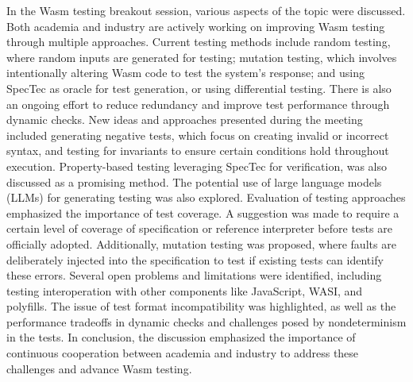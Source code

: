 \documentclass[a4paper,UKenglish]{dagrep-v2018}
\begin{document}
In the Wasm testing breakout session, various aspects of the topic were discussed.
Both academia and industry are actively working on improving Wasm testing through multiple approaches. Current testing methods include random testing, where random inputs are generated for testing; mutation testing, which involves intentionally altering Wasm code to test the system's response; and using SpecTec as oracle for test generation, or using differential testing. There is also an ongoing effort to reduce redundancy and improve test performance through dynamic checks.
New ideas and approaches presented during the meeting included generating negative tests, which focus on creating invalid or incorrect syntax, and testing for invariants to ensure certain conditions hold throughout execution. Property-based testing leveraging SpecTec for verification, was also discussed as a promising method. The potential use of large language models (LLMs) for generating testing was also explored.
Evaluation of testing approaches emphasized the importance of test coverage. A suggestion was made to require a certain level of coverage of specification or reference interpreter before tests are officially adopted. Additionally, mutation testing was proposed, where faults are deliberately injected into the specification to test if existing tests can identify these errors.
Several open problems and limitations were identified, including testing interoperation with other components like JavaScript, WASI, and polyfills. The issue of test format incompatibility was highlighted, as well as the performance tradeoffs in dynamic checks and challenges posed by nondeterminism in the tests.
In conclusion, the discussion emphasized the importance of continuous cooperation between academia and industry to address these challenges and advance Wasm testing.





\end{document}
